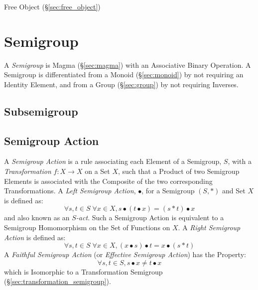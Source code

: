 Free Object (\S\ref{sec:free_object})



\section{Semigroup}\label{sec:semigroup}

A \emph{Semigroup} is Magma (\S\ref{sec:magma}) with an Associative
Binary Operation. A Semigroup is differentiated from a Monoid
(\S\ref{sec:monoid}) by not requiring an Identity Element, and from
a Group (\S\ref{sec:group}) by not requiring Inverses.



\subsection{Subsemigroup}\label{sec:subsemigroup}

\subsection{Semigroup Action}\label{sec:semigroup_action}

A \emph{Semigroup Action} is a rule associating each Element of a
Semigroup, $S$, with a \emph{Transformation} $f : X \rightarrow X$ on
a Set $X$, such that a Product of two Semigroup Elements is associated
with the Composite of the two corresponding Transformations. A
\emph{Left Semigroup Action}, $\bullet$, for a Semigroup $(S,*)$ and
Set $X$ is defined as:
\[
  \forall s,t \in S\;\forall x \in X, s \bullet (t \bullet x) = (s * t)
  \bullet x
\]
and also known as an \emph{$S$-act}. Such a Semigroup Action is
equivalent to a Semigroup Homomorphism on the Set of Functions on $X$.
A \emph{Right Semigroup Action} is defined as:
\[
  \forall s,t \in S\;\forall x \in X, (x \bullet s) \bullet t = x
  \bullet (s * t)
\]
A \emph{Faithful Semigroup Action} (or \emph{Effective Semigroup
  Action}) has the Property:
\[
  \forall s, t \in S, s \bullet x \neq t \bullet x
\]
which is Isomorphic to a Transformation Semigroup
(\S\ref{sec:transformation_semigroup}).



